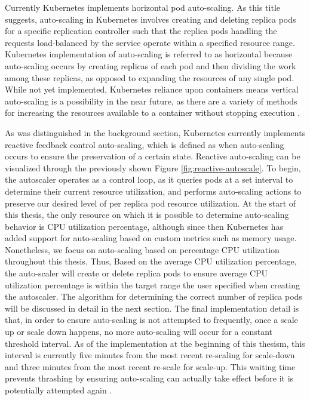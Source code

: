 Currently Kubernetes implements horizontal pod auto-scaling.
As this title suggests, auto-scaling in
Kubernetes involves creating and deleting replica pods for a specific replication
controller such that the replica pods handling the requests load-balanced by the service
operate within a specified resource range. Kubernetes
implementation of auto-scaling is referred to as horizontal because
auto-scaling occurs by creating replicas of each pod and then dividing the work
among these replicas, as opposed to expanding the resources of any single pod.
While not yet implemented, Kubernetes reliance upon containers means vertical
auto-scaling is a possibility in the near future, as there are a variety of
methods for increasing the resources available to a container without stopping
execution \cite{docker-up-and-running}.

As was distinguished in the background section, Kubernetes currently implements reactive
feedback control auto-scaling, which is defined as when auto-scaling occurs to
ensure the preservation of a certain state. Reactive auto-scaling can be
visualized through the previously shown Figure \ref{fig:reactive-autoscale}.
To begin, the autoscaler operates as a control loop,
as it queries pods at a set interval to determine
their current resource utilization, and performs auto-scaling actions to
preserve our desired level of per replica pod resource utilization.
At the start of this thesis, the only resource on which it is possible to
determine auto-scaling behavior is CPU utilization percentage, although since
then Kubernetes has added support for auto-scaling based on custom metrics such
as memory usage. Nonetheless, we focus on auto-scaling based on percentage CPU
utilization throughout this thesis.
Thus, Based on the average CPU utilization percentage, the
auto-scaler will create or delete replica pods to ensure average CPU utilization
percentage is within the target range the user specified when creating the
autoscaler. The algorithm for determining the correct number of replica pods
will be discussed in detail in the next section. The final implementation detail
is that, in order to ensure auto-scaling is not attempted to frequently, once a
scale up or scale down happens, no more auto-scaling will occur for a constant
threshold interval. As of the implementation at the beginning of this thesism,
this interval is currently five minutes from the most recent
re-scaling for scale-down and three minutes from the most recent re-scale for
scale-up. This waiting time prevents thrashing by ensuring
auto-scaling can actually take effect before it is potentially attempted again
\cite{k8s-horizontal-pod-autoscaler-user-guide}.
